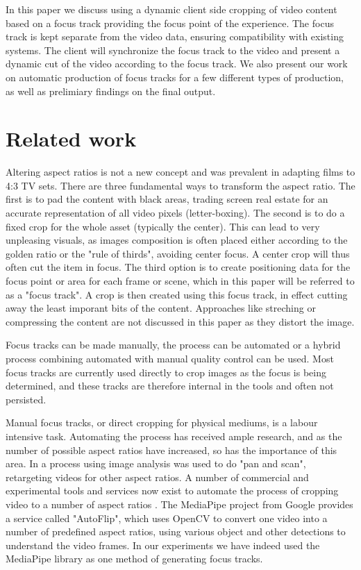 \documentclass[sigconf, review=true]{acmart}
\begin{document}
In this paper we discuss using a dynamic client side cropping of video content
based on a focus track providing the focus point of the experience. The focus
track is kept separate from the video data, ensuring compatibility with
existing systems. The client will synchronize the focus track to the video
and present a dynamic cut of the video according to the focus track. We also
present our work on automatic production of focus tracks for a few different
types of production, as well as prelimiary findings on the final output.

\section{Related work}

Altering aspect ratios is not a new concept and was prevalent in adapting
films to 4:3 TV sets. There are three fundamental ways to transform the
aspect ratio. The first is to pad the content with black areas, trading
screen real estate for an accurate representation of all video pixels
(letter-boxing). The second is to do a fixed crop for the whole asset
(typically the center). This can lead to very unpleasing visuals, as images
composition is often placed either according to the golden ratio or the "rule
of thirds", avoiding center focus. A center crop will thus often cut the item
in focus. The third option is to create positioning data for the focus point
or area for each frame or scene, which in this paper will be referred to as
a "focus track". A crop is then created using this focus track, in effect
cutting away the least imporant bits of the content. Approaches like
streching or compressing the content are not discussed in this paper as they
distort the image.

Focus tracks can be made manually, the process can be automated or a hybrid
process combining automated with manual quality control can be used. Most
focus tracks are currently used directly to crop images as the focus is being
determined, and these tracks are therefore internal in the tools and often
not persisted.

Manual focus tracks, or direct cropping for physical mediums, is a labour
intensive task. Automating the process has received ample research, and as
the number of possible aspect ratios have increased, so has the importance of
this area. In \cite{liu2006video} a process using image analysis was used to
do "pan and scan", retargeting videos for other aspect ratios. A number of
commercial and experimental tools and services now exist to automate the
process of cropping video to a number of aspect ratios \cite
{adobe_premiere,mediapipe,kamua}. The MediaPipe\cite{mediapipe} project from
Google provides a service called "AutoFlip", which uses OpenCV to convert one
video into a number of predefined aspect ratios, using various object and
other detections to understand the video frames. In our experiments we have
indeed used the MediaPipe library as one method of generating focus tracks.
\end{document}
